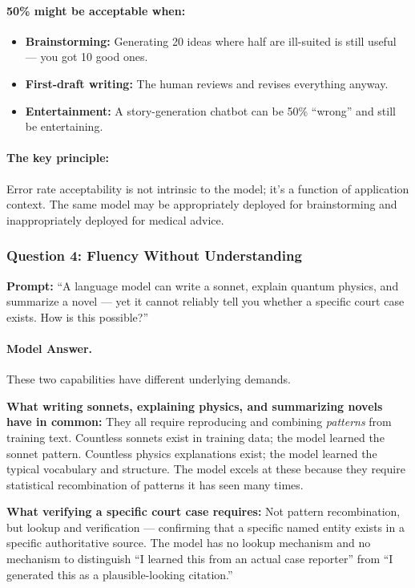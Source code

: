 \paragraph{50\% might be acceptable when:}
\begin{itemize}
    \item \textbf{Brainstorming:} Generating 20 ideas where half are ill-suited is still useful --- you got 10 good ones.
    \item \textbf{First-draft writing:} The human reviews and revises everything anyway.
    \item \textbf{Entertainment:} A story-generation chatbot can be 50\% ``wrong'' and still be entertaining.
\end{itemize}

\paragraph{The key principle:} Error rate acceptability is not intrinsic to the model; it's a function of application context. The same model may be appropriately deployed for brainstorming and inappropriately deployed for medical advice.

\subsubsection{Question 4: Fluency Without Understanding}

\textbf{Prompt:} ``A language model can write a sonnet, explain quantum physics, and summarize a novel --- yet it cannot reliably tell you whether a specific court case exists. How is this possible?''

\paragraph{Model Answer.}

These two capabilities have different underlying demands.

\textbf{What writing sonnets, explaining physics, and summarizing novels have in common:} They all require reproducing and combining \emph{patterns} from training text. Countless sonnets exist in training data; the model learned the sonnet pattern. Countless physics explanations exist; the model learned the typical vocabulary and structure. The model excels at these because they require statistical recombination of patterns it has seen many times.

\textbf{What verifying a specific court case requires:} Not pattern recombination, but lookup and verification --- confirming that a specific named entity exists in a specific authoritative source. The model has no lookup mechanism and no mechanism to distinguish ``I learned this from an actual case reporter'' from ``I generated this as a plausible-looking citation.''

